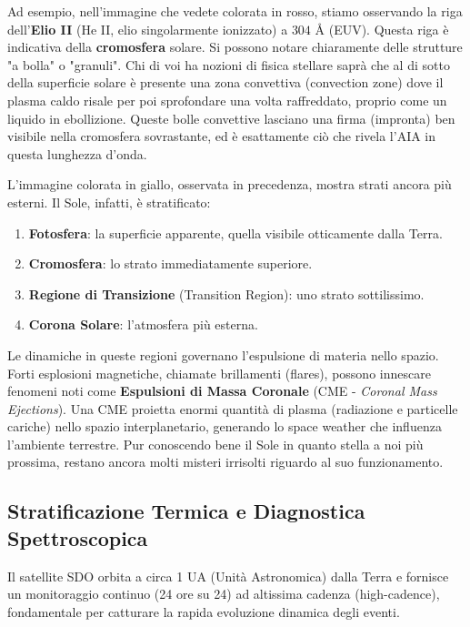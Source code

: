 Ad esempio, nell'immagine che vedete colorata in rosso, stiamo osservando la riga dell'\textbf{Elio II} (He II, elio singolarmente ionizzato) a $304\text{ \AA}$ (EUV).
Questa riga è indicativa della \textbf{cromosfera} solare. Si possono notare chiaramente delle strutture "a bolla" o "granuli". Chi di voi ha nozioni di fisica stellare saprà che al di sotto della superficie solare è presente una zona convettiva (convection zone) dove il plasma caldo risale per poi sprofondare una volta raffreddato, proprio come un liquido in ebollizione. Queste bolle convettive lasciano una firma (impronta) ben visibile nella cromosfera sovrastante, ed è esattamente ciò che rivela l'AIA in questa lunghezza d'onda.

L'immagine colorata in giallo, osservata in precedenza, mostra strati ancora più esterni. Il Sole, infatti, è stratificato:

\begin{enumerate}
    \item \textbf{Fotosfera}: la superficie apparente, quella visibile otticamente dalla Terra.
    \item \textbf{Cromosfera}: lo strato immediatamente superiore.
    \item \textbf{Regione di Transizione} (Transition Region): uno strato sottilissimo.
    \item \textbf{Corona Solare}: l'atmosfera più esterna.
\end{enumerate}

Le dinamiche in queste regioni governano l'espulsione di materia nello spazio. Forti esplosioni magnetiche, chiamate brillamenti (flares), possono innescare fenomeni noti come \textbf{Espulsioni di Massa Coronale} (CME - \textit{Coronal Mass Ejections}). Una CME proietta enormi quantità di plasma (radiazione e particelle cariche) nello spazio interplanetario, generando lo space weather che influenza l'ambiente terrestre. Pur conoscendo bene il Sole in quanto stella a noi più prossima, restano ancora molti misteri irrisolti riguardo al suo funzionamento.

    \subsection{Stratificazione Termica e Diagnostica Spettroscopica}
    
    Il satellite SDO orbita a circa 1 UA (Unità Astronomica) dalla Terra e fornisce un monitoraggio continuo (24 ore su 24) ad altissima cadenza (high-cadence), fondamentale per catturare la rapida evoluzione dinamica degli eventi.
    
